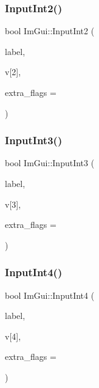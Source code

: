 \hypertarget{namespace_im_gui_a4142cc4545d789d76d51dee61c959a03}{}\label{namespace_im_gui_a4142cc4545d789d76d51dee61c959a03} 
\subsubsection{\texorpdfstring{Input\+Int2()}{InputInt2()}}
{\footnotesize\ttfamily bool Im\+Gui\+::\+Input\+Int2 (\begin{DoxyParamCaption}\item[{const char $\ast$}]{label,  }\item[{int}]{v\mbox{[}2\mbox{]},  }\item[{Im\+Gui\+Input\+Text\+Flags}]{extra\+\_\+flags = {} }\end{DoxyParamCaption})}

\hypertarget{namespace_im_gui_ab02fc4a19ed153984d3585296e1c74b1}{}\label{namespace_im_gui_ab02fc4a19ed153984d3585296e1c74b1} 
\subsubsection{\texorpdfstring{Input\+Int3()}{InputInt3()}}
{\footnotesize\ttfamily bool Im\+Gui\+::\+Input\+Int3 (\begin{DoxyParamCaption}\item[{const char $\ast$}]{label,  }\item[{int}]{v\mbox{[}3\mbox{]},  }\item[{Im\+Gui\+Input\+Text\+Flags}]{extra\+\_\+flags = {} }\end{DoxyParamCaption})}

\hypertarget{namespace_im_gui_ac714ecf202c82dc6caa0cbf344c85a13}{}\label{namespace_im_gui_ac714ecf202c82dc6caa0cbf344c85a13} 
\subsubsection{\texorpdfstring{Input\+Int4()}{InputInt4()}}
{\footnotesize\ttfamily bool Im\+Gui\+::\+Input\+Int4 (\begin{DoxyParamCaption}\item[{const char $\ast$}]{label,  }\item[{int}]{v\mbox{[}4\mbox{]},  }\item[{Im\+Gui\+Input\+Text\+Flags}]{extra\+\_\+flags = {} }\end{DoxyParamCaption})}

